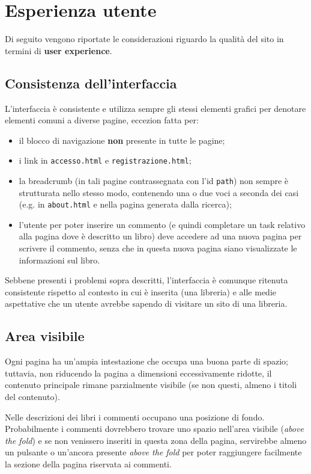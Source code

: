 \section{Esperienza utente}\label{sec:user-exp}
Di seguito vengono riportate le considerazioni riguardo la qualità del sito in
termini di \textbf{user experience}.

\subsection{Consistenza dell'interfaccia}\label{sec:user-ui_consistency}
L'interfaccia è consistente e utilizza sempre gli stessi elementi grafici per
denotare elementi comuni a diverse pagine, eccezion fatta per:
\begin{itemize}
\item il blocco di navigazione \textbf{non} presente in tutte le pagine;
\item i link in \texttt{accesso.html} e \texttt{registrazione.html};
\item la breadcrumb (in tali pagine contrassegnata con l'id \texttt{path}) non
sempre è strutturata nello stesso modo, contenendo una o due voci a seconda
dei casi (e.g. in \texttt{about.html} e nella pagina generata dalla ricerca);
\item l'utente per poter inserire un commento (e quindi completare un task
relativo alla pagina dove è descritto un libro) deve accedere ad una nuova
pagina per scrivere il commento, senza che in questa nuova pagina siano
visualizzate le informazioni sul libro.
\end{itemize}

Sebbene presenti i problemi sopra descritti, l'interfaccia è comunque ritenuta
consistente rispetto al contesto in cui è inserita (una libreria) e alle
medie aspettative che un utente avrebbe sapendo di visitare un sito di una
libreria.

\subsection{Area visibile}
Ogni pagina ha un'ampia intestazione che occupa una buona parte di spazio;
tuttavia, non riducendo la pagina a dimensioni eccessivamente ridotte, il
contenuto principale rimane parzialmente visibile (se non questi, almeno i
titoli del contenuto).

Nelle descrizioni dei libri i commenti occupano una posizione di fondo.
Probabilmente i commenti dovrebbero trovare uno spazio nell'area visibile
(\textit{above the fold}) e se non venissero inseriti in questa zona della
pagina, servirebbe almeno un pulsante o un'ancora presente \textit{above the
fold} per poter raggiungere facilmente la sezione della pagina riservata ai
commenti.


